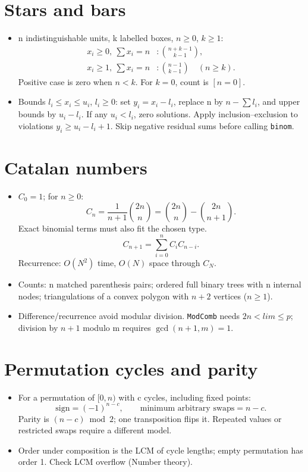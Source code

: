 \section{Stars and bars}
\begin{itemize}[nosep,leftmargin=*]
\item n indistinguishable units, k labelled boxes, $n\ge0$, $k\ge1$:
\[
 \begin{aligned}
 x_i\ge0,\ \sum x_i=n &: \binom{n+k-1}{k-1},\\
 x_i\ge1,\ \sum x_i=n &: \binom{n-1}{k-1}\quad(n\ge k).
 \end{aligned}
\]
Positive case is zero when $n<k$. For $k=0$, count is $[n=0]$.
\item Bounds $l_i\le x_i\le u_i$, $l_i\ge0$: set $y_i=x_i-l_i$,
replace n by $n-\sum l_i$, and upper bounds by $u_i-l_i$.
If any $u_i<l_i$, zero solutions. Apply inclusion--exclusion
to violations $y_i\ge u_i-l_i+1$.
Skip negative residual sums before calling \texttt{binom}.
\end{itemize}

\section{Catalan numbers}
\begin{itemize}[nosep,leftmargin=*]
\item $C_0=1$; for $n\ge0$:
\[
C_n=\frac{1}{n+1}\binom{2n}n
=\binom{2n}n-\binom{2n}{n+1}.
\]
Exact binomial terms must also fit the chosen type.
\[
 C_{n+1}=\sum_{i=0}^n C_iC_{n-i}.
\]
Recurrence: $O(N^2)$ time, $O(N)$ space through $C_N$.
\item Counts: n matched parenthesis pairs; ordered full binary
 trees with n internal nodes; triangulations of a convex polygon
 with $n+2$ vertices ($n\ge1$).
\item Difference/recurrence avoid modular division.
\texttt{ModComb} needs $2n<lim\le p$; division by $n+1$
modulo m requires $\gcd(n+1,m)=1$.
\end{itemize}

\section{Permutation cycles and parity}
\begin{itemize}[nosep,leftmargin=*]
\item For a permutation of $[0,n)$ with c cycles, including fixed points:
\[
 \text{sign}=(-1)^{n-c},\qquad
 \text{minimum arbitrary swaps}=n-c.
\]
Parity is $(n-c)\bmod2$; one transposition flips it.
Repeated values or restricted swaps require a different model.
\item Order under composition is the LCM of cycle lengths;
empty permutation has order 1. Check LCM overflow (Number theory).
\end{itemize}
